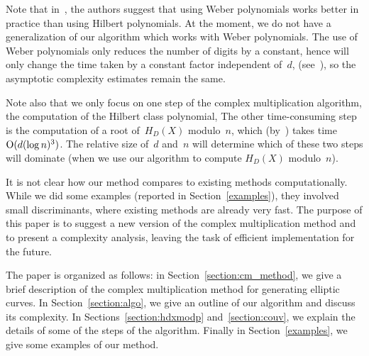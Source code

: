 \documentclass{amsart}
\newcommand{\bigo}{{\rm O}}
\theoremstyle{plain}
\begin{document}


Note that in~\cite{atmor}, the authors suggest that using Weber polynomials
works better in practice than using Hilbert polynomials. At the moment, we do not have
a generalization of our algorithm which works with Weber polynomials.
The use of Weber polynomials only reduces the number of digits by a constant,
hence will only change the time taken by a constant factor   
independent of~$d$, (see~\cite[p.409]{cohen}), so the asymptotic complexity 
estimates remain the same.

Note also that we only focus on one step of the complex multiplication
algorithm, the computation of the Hilbert class polynomial,
The other time-consuming step is the 
computation of a root of~$H_D(X)$ modulo~$n$, which (by~\cite[\S5.10]{ll})
takes time $\bigo(d (\log n)^3)$. The relative size of~$d$ and~$n$ will determine
which of these two steps will dominate (when we use our algorithm to
compute $H_D(X)$ modulo~$n$). 

It is not clear how our method compares to existing
methods computationally. While we did some examples
(reported in Section~\ref{examples}), they involved small discriminants,
where existing methods are already very fast. The purpose of
this paper is to suggest a new version of the complex multiplication
method and to present a complexity analysis, leaving the task of
efficient implementation for the future.

The paper is organized as follows:
in Section~\ref{section:cm_method}, we give a brief description of the 
complex multiplication method for generating elliptic curves.
In Section~\ref{section:algo}, we give an outline of our
algorithm and discuss its complexity. 
In Sections~\ref{section:hdxmodp} and~\ref{section:couv}, 
we explain the details of some of the steps of the algorithm. 
Finally in Section~\ref{examples}, we give some
examples of our method.
\end{document}
